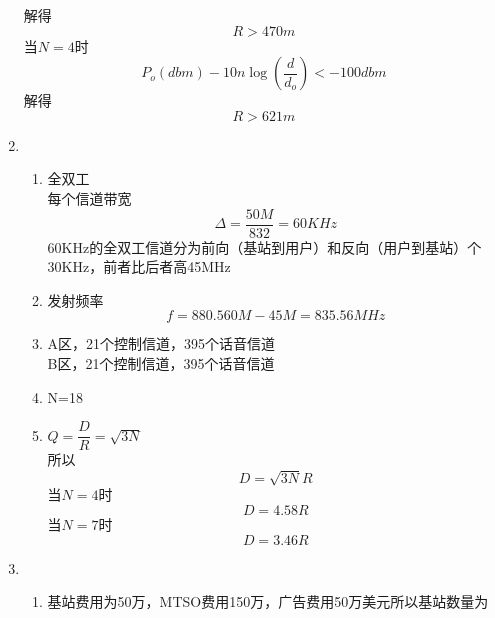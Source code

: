 \documentclass{article}
\begin{document}
\begin{enumerate}
\begin{equation}
          \end{equation}
          解得
          \begin{equation}
            R>470m
          \end{equation}
          当$N=4$时
          \begin{equation}
            P_o(dbm)-10n\log(\frac{d}{d_o})<-100dbm
          \end{equation}
          解得
          \begin{equation}
            R>621m
          \end{equation}
    \item \begin{enumerate}
        \item 全双工\\
              每个信道带宽
              \begin{equation}
                \Delta=\frac{50M}{832}=60KHz
              \end{equation}
              60KHz的全双工信道分为前向（基站到用户）和反向（用户到基站）个30KHz，前者比后者高45MHz
        \item 发射频率
              \begin{equation}
                f=880.560M-45M=835.56MHz
              \end{equation}      
        \item A区，21个控制信道，395个话音信道\\
              B区，21个控制信道，395个话音信道
        \item N=18
        \item $Q=\dfrac{D}{R}=\sqrt{3N}$\\
              所以
              \begin{equation}
                D=\sqrt{3N}R
              \end{equation}
              当$N=4$时
              \begin{equation}
                D=4.58R
              \end{equation}
              当$N=7$时
              \begin{equation}
                D=3.46R
              \end{equation}
    \end{enumerate}
    \item \begin{enumerate}
        \item 基站费用为50万，MTSO费用150万，广告费用50万美元所以基站数量为
              \begin{equation}

\end{equation}
\end{enumerate}
\end{enumerate}
\end{document}
